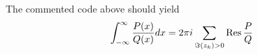 %    
%
%    

\begin{ex}
    The commented code above should yield
    \begin{align*}
        \int_{-\infty}^\infty \frac{P(x)}{Q(x)}dx=2\pi i\sum_{\Im(z_k)>0}\operatorname{Res}\frac{P}{Q}
    \end{align*}
\end{ex}
